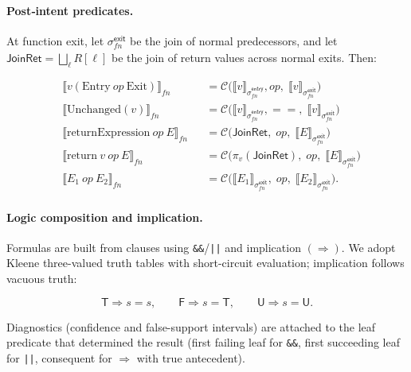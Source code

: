 \documentclass[10pt, conference]{IEEEtran}
\begin{document}
\paragraph{Post‑intent predicates.}
At function exit, let
\(\sigma^{\mathsf{exit}}_{\mathit{fn}}\) be the join of normal
predecessors, and let
\(\mathsf{JoinRet} = \bigsqcup_{\ell} R[\ell]\) be the join of
return values across normal exits.  Then:

\[
\begin{aligned}
&\llbracket v(\mathrm{Entry}\ op\ \mathrm{Exit})\rrbracket_{\mathit{fn}}
  &&= \mathcal{C}\bigl(
      \llbracket v \rrbracket_{\sigma^{\mathsf{entry}}_{\mathit{fn}}}\!,
      op,\;
      \llbracket v \rrbracket_{\sigma^{\mathsf{exit}}_{\mathit{fn}}}\bigr)\\[0.2em]
&\llbracket \mathrm{Unchanged}(v) \rrbracket_{\mathit{fn}}
  &&= \mathcal{C}\bigl(
      \llbracket v \rrbracket_{\sigma^{\mathsf{entry}}_{\mathit{fn}}}\!,
      ==,\;
      \llbracket v \rrbracket_{\sigma^{\mathsf{exit}}_{\mathit{fn}}}\bigr)\\[0.2em]
&\llbracket \mathrm{returnExpression}\ op\ E \rrbracket_{\mathit{fn}}
  &&= \mathcal{C}\bigl(\mathsf{JoinRet},\; op,\;
                        \llbracket E \rrbracket_{\sigma^{\mathsf{exit}}_{\mathit{fn}}}\bigr)\\[0.2em]
&\llbracket \mathrm{return}\ v\ op\ E \rrbracket_{\mathit{fn}}
  &&= \mathcal{C}\bigl(\pi_v(\mathsf{JoinRet}),\; op,\;
                        \llbracket E \rrbracket_{\sigma^{\mathsf{exit}}_{\mathit{fn}}}\bigr)\\[0.2em]
&\llbracket E_1\ op\ E_2 \rrbracket_{\mathit{fn}}
  &&= \mathcal{C}\bigl(\llbracket E_1 \rrbracket_{\sigma^{\mathsf{exit}}_{\mathit{fn}}},\; op,\;
                        \llbracket E_2 \rrbracket_{\sigma^{\mathsf{exit}}_{\mathit{fn}}}\bigr).
\end{aligned}
\]

\paragraph{Logic composition and implication.}
Formulas are built from clauses using \texttt{&&}/\texttt{||} and
implication \((\Rightarrow)\).  We adopt Kleene three-valued truth
tables with short-circuit evaluation; implication follows
vacuous truth:

\[
\mathsf{T}\Rightarrow s = s,\qquad
\mathsf{F}\Rightarrow s = \mathsf{T},\qquad
\mathsf{U}\Rightarrow s = \mathsf{U}.
\]

Diagnostics (confidence and false-support intervals) are attached
to the leaf predicate that determined the result (first failing
leaf for \texttt{&&}, first succeeding leaf for \texttt{||},
consequent for \(\Rightarrow\) with true antecedent).
\end{document}
